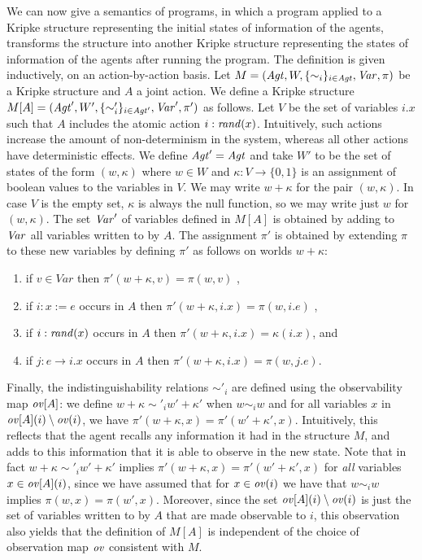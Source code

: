 \documentclass[]{llncs}
\newcommand{\be}{\begin{enumerate}}
\newcommand{\ee}{\end{enumerate}}
\newcommand{\rand}{{\it rand}}
\newcommand{\omap}{{\it ov}}
\newcommand{\Agt}{{\it Agt}}
\newcommand{\Var}{{\it Var}}
\begin{document}
We can now give a semantics of programs,  in which a program applied to a Kripke structure
representing the  initial states of information of the agents, 
transforms the structure into another Kripke structure  representing 
the states of information of the agents after running the program. The definition is 
given inductively, on an action-by-action basis. 
Let $M = (\Agt, W, \{\sim_i\}_{i\in \Agt}, \Var, \pi)$ be  a Kripke structure and 
$A$ a joint action. We define a Kripke structure 
$M [A] = (\Agt', W', \{\sim'_i\}_{i\in \Agt'}, \Var', \pi')$ as follows. 
Let $V$ be the set of variables $i.x$ such that $A$ includes
the atomic action $i:\rand(x)$. Intuitively, such actions increase the 
amount of non-determinism in the system, whereas all other actions  
have deterministic effects. We define
$\Agt' = \Agt$ and take  $W'$ to be the set of states of the form $(w, \kappa)$ where 
$w\in W$ and  $\kappa : V \rightarrow \{0,1\}$ is 
an assignment of boolean values to the variables  in $V$. 
We may write $w+\kappa$ for the pair $(w,\kappa)$. 
In case $V$ is the empty set, $\kappa$ is always the null
 function, so we 
may write just $w$ for $(w,\kappa)$. The set $\Var'$ of variables defined in 
$M[A]$ is obtained by adding to $\Var$ all variables written to by $A$. 
The assignment $\pi'$ is obtained by extending $\pi$ to these new variables
by defining $\pi'$ as follows on worlds $w+\kappa$: 
\be
\item if $v \in Var$ then $\pi'(w+\kappa,v ) = \pi(w,v)$ , 
\item if $i: x:=e$ occurs in $A$ then $\pi'(w+\kappa,i.x) = \pi(w,i.e)$ , 
\item if $i: \rand(x)$ occurs in $A$ then $\pi'(w+\kappa,i.x) = \kappa(i.x)$, and 
\item if $j: e \rightarrow i.x$ occurs in $A$ then $\pi'(w+\kappa,i.x) = \pi(w,j.e)$.  
\ee 
Finally, the indistinguishability relations $\sim'_i$ are defined using the observability map 
$\omap [A]$: we define 
$w+\kappa \sim'_i w'+\kappa'$ when $w\sim_i w$ 
and for all variables $x$ in $\omap[A](i)\setminus \omap(i)$, we have $\pi'(w+\kappa, x) = \pi'(w'+\kappa', x)$. 
Intuitively, this reflects that the agent recalls any information it had in the structure $M$, 
and adds to this information that it is able to observe in the new state. 
Note that in fact $w+\kappa \sim'_i w'+\kappa'$ implies $\pi'(w+\kappa, x) = \pi'(w'+\kappa', x)$
for {\em all} variables $x\in \omap[A](i)$, 
since we have assumed that for $x\in \omap(i)$ we have that  $w\sim_i w$ implies $\pi(w,x) = \pi(w',x)$. 
Moreover, since the set $\omap[A](i) \setminus \omap(i)$ is just the set of 
variables written to by $A$ that are made observable to $i$, this observation 
also yields that the definition of $M[A]$ is independent of the 
choice of observation map $\omap$ consistent with $M$. 
\end{document}

